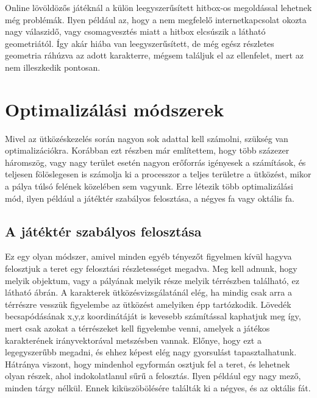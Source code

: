 Online lövöldözős játéknál a külön leegyszerűsített hitbox-os megoldással lehetnek még problémák. Ilyen például az, hogy a nem megfelelő internetkapcsolat okozta nagy válaszidő, vagy csomagvesztés miatt a hitbox elcsúszik a látható geometriától. Így akár hiába van leegyszerűsített, de még egész részletes geometria ráhúzva az adott karakterre, mégsem találjuk el az ellenfelet, mert az nem illeszkedik pontosan.

\section{Optimalizálási módszerek}

Mivel az ütközéskezelés során nagyon sok adattal kell számolni, szükség van optimalizációkra. Korábban ezt részben már említettem, hogy több százezer háromszög, vagy nagy terület esetén nagyon erőforrás igényesek a számítások, és teljesen fölöslegesen is számolja ki a processzor a teljes területre a ütközést, mikor a pálya túlsó felének közelében sem vagyunk. Erre létezik több optimalizálási mód, ilyen például a játéktér szabályos felosztása, a négyes fa vagy oktális fa.

\subsection{A játéktér szabályos felosztása}

Ez egy olyan módszer, amivel minden egyéb tényezőt figyelmen kívül hagyva felosztjuk a teret egy felosztási részletességet megadva. Meg kell adnunk, hogy melyik objektum, vagy a pályának melyik része melyik térrészben található, ez látható  ábrán. A karakterek ütközésvizsgálatánál elég, ha mindig csak arra a térrészre vesszük figyelembe az ütközést amelyiken épp tartózkodik. Lövedék becsapódásának x,y,z koordinátáját is kevesebb számítással kaphatjuk meg így, mert csak azokat a térrészeket kell figyelembe venni, amelyek a játékos karakterének irányvektorával metszésben vannak. Előnye, hogy ezt a legegyszerűbb megadni, és ehhez képest elég nagy gyorsulást tapasztalhatunk. Hátránya viszont, hogy mindenhol egyformán osztjuk fel a teret, és lehetnek olyan részek, ahol indokolatlanul sűrű a felosztás. Ilyen például egy nagy mező, minden tárgy nélkül. Ennek kiküszöbölésére találták ki a négyes, és az oktális fát.

